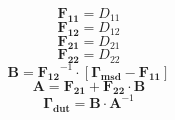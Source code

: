 \[ \mathbf{F_{11}} = D_{11} \]
\[ \mathbf{F_{12}} = D_{12} \]
\[ \mathbf{F_{21}} = D_{21} \]
\[ \mathbf{F_{22}} = D_{22} \]
\[ \mathbf{B}=\mathbf{F_{12}}^{-1}\cdot\left[ \mathbf{\Gamma_{msd}} -
\mathbf{F_{11}} \right]  \]
\[ \mathbf{A}=\mathbf{F_{21}}+ \mathbf{F_{22}}\cdot\mathbf{B} \]
\[ \mathbf{\Gamma_{dut}} = \mathbf{B} \cdot \mathbf{A}^{-1} \]
